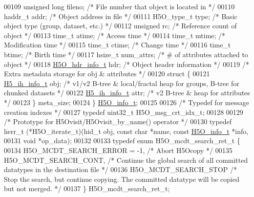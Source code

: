 \begin{DoxyCode}
00109     \textcolor{keywordtype}{unsigned} \textcolor{keywordtype}{long}   fileno;     \textcolor{comment}{/* File number that object is located in */}
00110     haddr\_t         addr;       \textcolor{comment}{/* Object address in file   */}
00111     H5O\_type\_t      type;       \textcolor{comment}{/* Basic object type (group, dataset, etc.) */}
00112     \textcolor{keywordtype}{unsigned}        rc;     \textcolor{comment}{/* Reference count of object    */}
00113     time\_t      atime;      \textcolor{comment}{/* Access time          */}
00114     time\_t      mtime;      \textcolor{comment}{/* Modification time        */}
00115     time\_t      ctime;      \textcolor{comment}{/* Change time          */}
00116     time\_t      btime;      \textcolor{comment}{/* Birth time           */}
00117     hsize\_t         num\_attrs;  \textcolor{comment}{/* # of attributes attached to object */}
00118     \hyperlink{struct_h5_o__hdr__info__t}{H5O\_hdr\_info\_t}      hdr;            \textcolor{comment}{/* Object header information */}
00119     \textcolor{comment}{/* Extra metadata storage for obj & attributes */}
00120     \textcolor{keyword}{struct }\{
00121         \hyperlink{struct_h5__ih__info__t}{H5\_ih\_info\_t}   obj;             \textcolor{comment}{/* v1/v2 B-tree & local/fractal heap for groups, B-tree
       for chunked datasets */}
00122         \hyperlink{struct_h5__ih__info__t}{H5\_ih\_info\_t}   attr;            \textcolor{comment}{/* v2 B-tree & heap for attributes */}
00123     \} meta\_size;
00124 \} \hyperlink{struct_h5_o__info__t}{H5O\_info\_t};
00125 
00126 \textcolor{comment}{/* Typedef for message creation indexes */}
00127 \textcolor{keyword}{typedef} uint32\_t H5O\_msg\_crt\_idx\_t;
00128 
00129 \textcolor{comment}{/* Prototype for H5Ovisit/H5Ovisit\_by\_name() operator */}
00130 \textcolor{keyword}{typedef} herr\_t (*H5O\_iterate\_t)(hid\_t obj, \textcolor{keyword}{const} \textcolor{keywordtype}{char} *name, \textcolor{keyword}{const} \hyperlink{struct_h5_o__info__t}{H5O\_info\_t} *info,
00131     \textcolor{keywordtype}{void} *op\_data);
00132 
00133 \textcolor{keyword}{typedef} \textcolor{keyword}{enum} H5O\_mcdt\_search\_ret\_t \{
00134     H5O\_MCDT\_SEARCH\_ERROR = -1, \textcolor{comment}{/* Abort H5Ocopy */}
00135     H5O\_MCDT\_SEARCH\_CONT,   \textcolor{comment}{/* Continue the global search of all committed datatypes in the destination
       file */}
00136     H5O\_MCDT\_SEARCH\_STOP    \textcolor{comment}{/* Stop the search, but continue copying.  The committed datatype will be
       copied but not merged. */}
00137 \} H5O\_mcdt\_search\_ret\_t;

\end{DoxyCode}
